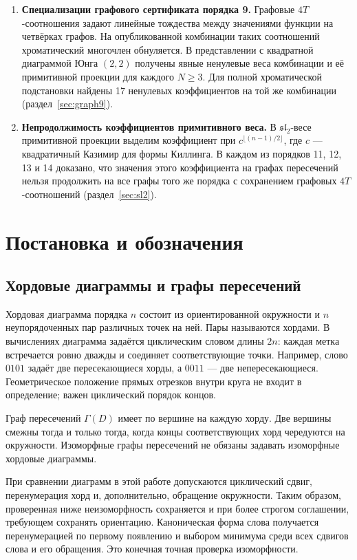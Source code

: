 \documentclass[11pt,a4paper]{article}
\numberwithin{equation}{section}
\theoremstyle{definition}
\theoremstyle{remark}
\newcommand{\sll}{\mathfrak{sl}}
\begin{document}
\begin{enumerate}[itemsep=.45em,topsep=.35em]
\item \textbf{Специализации графового сертификата порядка 9.}
Графовые $4T$-соотношения задают линейные тождества
между значениями функции на четвёрках графов. На опубликованной
комбинации таких соотношений~\cite{fkpu} хроматический многочлен
обнуляется. В представлении с квадратной диаграммой Юнга $(2,2)$
получены явные ненулевые веса комбинации и её примитивной проекции
для каждого $N\ge3$. Для полной хроматической подстановки найдены
17 ненулевых коэффициентов на той же комбинации
(раздел~\ref{sec:graph9}).

\item \textbf{Непродолжимость коэффициентов примитивного веса.}
В $\sll_2$-весе примитивной проекции выделим коэффициент
при $c^{\lfloor(n-1)/2\rfloor}$, где $c$ --- квадратичный Казимир для
формы Киллинга. В каждом из порядков 11, 12, 13 и 14 доказано, что
значения этого коэффициента на графах пересечений нельзя продолжить
на все графы того же порядка с сохранением графовых $4T$-соотношений
(раздел~\ref{sec:sl2}).
\end{enumerate}

\section{Постановка и обозначения}

\subsection{Хордовые диаграммы и графы пересечений}

Хордовая диаграмма порядка $n$ состоит из ориентированной окружности
и $n$ неупорядоченных пар различных точек на ней. Пары называются хордами.
В вычислениях диаграмма задаётся циклическим словом длины $2n$:
каждая метка встречается ровно дважды и соединяет соответствующие точки.
Например, слово $0101$ задаёт две пересекающиеся хорды, а $0011$ ---
две непересекающиеся. Геометрическое положение прямых отрезков внутри
круга не входит в определение; важен циклический порядок концов.

Граф пересечений $\Gamma(D)$ имеет по вершине на каждую хорду.
Две вершины смежны тогда и только тогда, когда концы соответствующих
хорд чередуются на окружности. Изоморфные графы пересечений не обязаны
задавать изоморфные хордовые диаграммы.

При сравнении диаграмм в этой работе допускаются циклический сдвиг,
перенумерация хорд и, дополнительно, обращение окружности. Таким образом,
проверенная ниже неизоморфность сохраняется и при более строгом соглашении,
требующем сохранять ориентацию. Каноническая форма слова получается
перенумерацией по первому появлению и выбором минимума среди всех сдвигов
слова и его обращения. Это конечная точная проверка изоморфности.
\end{document}

